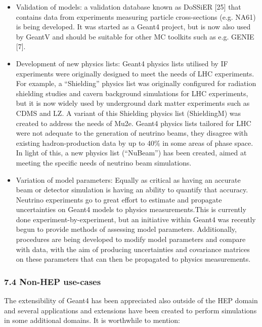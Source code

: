 \documentclass[12pt,a4paper]{article}
\begin{document}
\begin{itemize}
\item
  Validation of models: a validation database known as DoSSiER {[}25{]}
  that contains data from experiments measuring particle cross-sections
  (e.g. NA61) is being developed. It was started as a Geant4 project,
  but is now also used by GeantV and should be suitable for other MC
  toolkits such as e.g. GENIE {[}7{]}.
\item
  Development of new physics lists: Geant4 physics lists utilised by IF
  experiments were originally designed to meet the needs of LHC
  experiments. For example, a ``Shielding'' physics list was originally
  configured for radiation shielding studies and cavern background
  simulations for LHC experiments, but it is now widely used by
  underground dark matter experiments such as CDMS and LZ. A variant of
  this Shielding physics list (ShieldingM) was created to address the
  needs of Mu2e. Geant4 physics lists tailored for LHC were not adequate
  to the generation of neutrino beams, they disagree with existing
  hadron-production data by up to 40\% in some areas of phase space. In
  light of this, a new physics list (``NuBeam'') has been created, aimed
  at meeting the specific needs of neutrino beam simulations.
\item
  Variation of model parameters: Equally as critical as having an
  accurate beam or detector simulation is having an ability to quantify
  that accuracy. Neutrino experiments go to great effort to estimate and
  propagate uncertainties on Geant4 models to physics measurements.This
  is currently done experiment-by-experiment, but an initiative within
  Geant4 was recently begun to provide methods of assessing model
  parameters. Additionally, procedures are being developed to modify
  model parameters and compare with data, with the aim of producing
  uncertainties and covariance matrices on these parameters that can
  then be propagated to physics measurements.
\end{itemize}

\hypertarget{non-hep-use-cases}{%
\subsubsection{7.4 Non-HEP use-cases}\label{non-hep-use-cases}}

The extensibility of Geant4 has been appreciated also outside of the HEP
domain and several applications and extensions have been created to
perform simulations in some additional domains. It is worthwhile to
mention:
\end{document}
